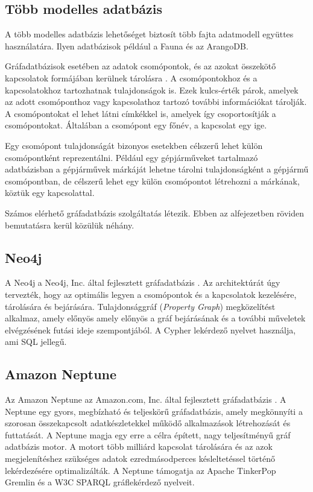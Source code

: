 \subsection{Több modelles adatbázis}

A több modelles adatbázis lehetőséget biztosít több fajta adatmodell együttes használatára. Ilyen adatbázisok például a Fauna és az ArangoDB.


Gráfadatbázisok esetében az adatok csomópontok, és az azokat összekötő kapcsolatok formájában kerülnek tárolásra \cite{adatok-leirasa}. A csomópontokhoz és a kapcsolatokhoz tartozhatnak tulajdonságok is. Ezek kulcs-érték párok, amelyek az adott csomóponthoz vagy kapcsolathoz tartozó további információkat tárolják. A csomópontokat el lehet látni címkékkel is, amelyek így csoportosítják a csomópontokat. Általában a csomópont egy főnév, a kapcsolat egy ige.

\bigskip

Egy csomópont tulajdonságát bizonyos esetekben célszerű lehet külön csomópontként reprezentálni. Például egy gépjárműveket tartalmazó adatbázisban a gépjárművek márkáját lehetne tárolni tulajdonságként a gépjármű csomópontban, de célszerű lehet egy külön csomópontot létrehozni a márkának, köztük egy kapcsolattal.


Számos elérhető gráfadatbázis szolgáltatás létezik. Ebben az alfejezetben röviden bemutatásra kerül közülük néhány.

\subsection{Neo4j}

A Neo4j a Neo4j, Inc. által fejlesztett gráfadatbázis \cite{neo4j}. Az architektúrát úgy tervezték, hogy az optimális legyen a csomópontok és a kapcsolatok kezelésére, tárolására és bejárására. Tulajdonsággráf (\textit{Property Graph}) megközelítést alkalmaz, amely előnyös amely előnyös a gráf bejárásának és a további műveletek elvégzésének futási ideje szempontjából. A Cypher lekérdező nyelvet használja, ami SQL jellegű.

\subsection{Amazon Neptune}

Az Amazon Neptune az Amazon.com, Inc. által fejlesztett gráfadatbázis \cite{neptune}. A Neptune egy gyors, megbízható és teljeskörű gráfadatbázis, amely megkönnyíti a szorosan összekapcsolt adatkészletekkel működő alkalmazások létrehozását és futtatását. A Neptune magja egy erre a célra épített, nagy teljesítményű gráf adatbázis motor. A motort több milliárd kapcsolat tárolására és az azok megjelenítéshez szükséges adatok ezredmásodperces késleltetéssel történő lekérdezésére optimalizálták. A Neptune támogatja az Apache TinkerPop Gremlin és a W3C SPARQL gráflekérdező nyelveit.

